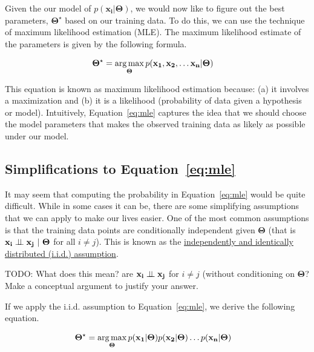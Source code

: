 \documentclass[assignment03_Solutions]{subfiles}
\begin{document}
Given the our model of $p(\mathbf{x_i}|\mathbf{\Theta})$, we would now like to figure out the best parameters, $\mathbf{\Theta}^\star$ based on our training data.  To do this, we can use the technique of maximum likelihood estimation (MLE).  The maximum likelihood estimate of the parameters is given by the following formula.

\begin{align}
\mathbf{\Theta^\star} &= \operatorname*{arg\,max}_{\mathbf{\Theta}} p(\mathbf{x_1}, \mathbf{x_2}, \ldots \mathbf{x_n} | \mathbf{\Theta}) \label{eq:mle}
\end{align}

This equation is known as maximum likelihood estimation because: (a) it involves a maximization and (b) it is a likelihood (probability of data given a hypothesis or model).  Intuitively, Equation~\ref{eq:mle} captures the idea that we should choose the model parameters that makes the observed training data as likely as possible under our model.

\subsection{Simplifications to Equation~\ref{eq:mle}}

It may seem that computing the probability in Equation~\ref{eq:mle} would be quite difficult.   While in some cases it can be, there are some simplifying assumptions that we can apply to make our lives easier.  One of the most common assumptions is that the training data points are conditionally independent given $\mathbf{\Theta}$ (that is $\mathbf{x_i} \perp\!\!\!\perp \mathbf{x_j}~|~\mathbf{\Theta}$ for all $i \neq j$).  This is known as the \href{https://en.wikipedia.org/wiki/Independent_and_identically_distributed_random_variables}{independently and identically distributed (i.i.d.) assumption}.

\begin{understandingcheck}
TODO: What does this mean?  are $\mathbf{x_i} \perp\!\!\!\perp \mathbf{x_j}$ for $i \neq j$ (without conditioning on $\mathbf{\Theta}$?  Make a conceptual argument to justify your answer.
\end{understandingcheck}

If we apply the i.i.d. assumption to Equation~\ref{eq:mle}, we derive the following equation.

\begin{align}
\mathbf{\Theta^\star} &= \operatorname*{arg\,max}_{\mathbf{\Theta}} p(\mathbf{x_1} |  \mathbf{\Theta}) p(\mathbf{x_2} | \mathbf{\Theta}) \ldots p(\mathbf{x_n} | \mathbf{\Theta}) \label{eq:mleiid}
\end{align}
\end{document}

